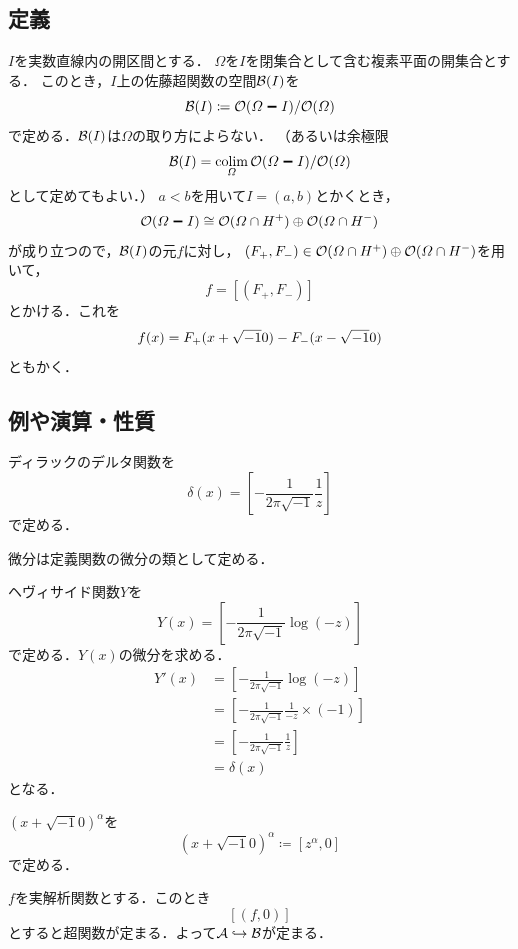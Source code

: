 \subsection{定義}
\(I\)を実数直線内の開区間とする．
\(\varOmega\)を\(I\)を閉集合として含む複素平面の開集合とする．
このとき，\(I\)上の佐藤超関数の空間\(\mathcal{B}(I)\)を
\[
    \cB(I)\coloneqq \cO(\varOmega\sm I)/\cO(\varOmega)
\]で定める．\(\mathcal{B}(I)\)は\(\varOmega\)の取り方によらない．
（あるいは余極限\[
    \cB(I)=\colim_{\varOmega} \cO(\varOmega\sm I)/\cO(\varOmega)
\]として定めてもよい．）
\(a<b\)を用いて\(I=(a,b)\)とかくとき，
\[
    \cO(\varOmega \sm I)
    \cong 
    \cO(\varOmega\cap H^{+})
    \oplus
    \cO(\varOmega\cap H^{-})
\]が成り立つので，\(\mathcal{B}(I)\)の元\(f\)に対し，
\((F_{+},F_{-})\in\mathcal{O}(\varOmega\cap H^{+})
    \oplus
    \mathcal{O}(\varOmega\cap H^{-})
\)を用いて，\[
    f=[(F_{+},F_{-})]
\]とかける．これを\[
    f(x)=F_{+}(x+\sqrt{-1} 0)-F_{-}(x-\sqrt{-1} 0)
\]ともかく．
\subsection{例や演算・性質}

\begin{EG}
  ディラックのデルタ関数を
  \[
    \delta(x)=\left[-\frac{1}{2\pi\sqrt{-1}}\frac{1}{z}\right]
  \]
  で定める．
\end{EG}

微分は定義関数の微分の類として定める．
\begin{EG}
  ヘヴィサイド関数\(Y\)を
  \[
    Y(x)=\left[-\frac{1}{2\pi\sqrt{-1}}\log(-z)\right]
  \]
  で定める．\(Y(x)\)の微分を求める．
  \begin{align*}
    Y'(x)
    &=\left[-\frac{1}{2\pi\sqrt{-1}}\log(-z)\right]\\
    &=\left[-\frac{1}{2\pi\sqrt{-1}}\frac{1}{-z}\times(-1)\right]\\
    &=\left[-\frac{1}{2\pi\sqrt{-1}}\frac{1}{z}\right]\\
    &=\delta(x)
  \end{align*}
  となる．
\end{EG}

\begin{EG}
  \((x+\sqrt{-1}0)^\alpha\)を
  \[
    (x+\sqrt{-1}0)^\alpha\coloneqq
    \left[z^{\alpha},0\right]
  \]
  で定める．
\end{EG}

\begin{EG}
  \(f\)を実解析関数とする．このとき
  \[
    [(f,0)]
  \]
  とすると超関数が定まる．よって\(\mathcal{A}\hookrightarrow\mathcal{B}\)が定まる．
\end{EG}


